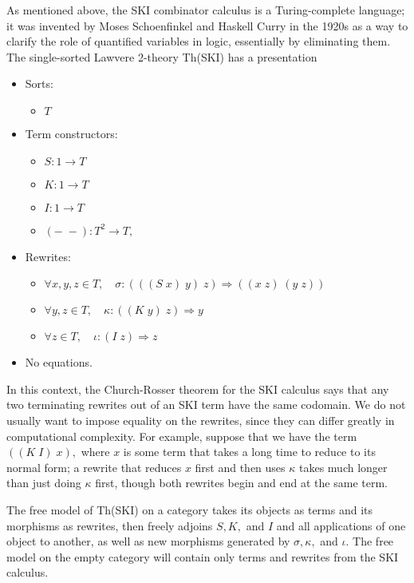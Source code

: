 \documentclass{article}
\newcommand{\maps}{\colon}
\begin{document}
As mentioned above, the SKI combinator calculus is a Turing-complete language; it was invented by Moses Schoenfinkel and Haskell Curry in the 1920s as a way to clarify the role of quantified variables in logic, essentially by eliminating them.  The single-sorted Lawvere 2-theory Th(SKI) has a presentation
\begin{center}
  \begin{itemize}
    \item Sorts:
    \begin{itemize}
      \item $T$
    \end{itemize}
    \item Term constructors:
    \begin{itemize}
      \item $S\maps 1 \to T$
      \item $K\maps 1 \to T$
      \item $I\maps 1 \to T$
      \item $(-\;-)\maps T^2 \to T,$
    \end{itemize}
    \item Rewrites:
    \begin{itemize}
      \item $\forall x,y,z \in T, \quad \sigma \maps (((S\; x)\; y)\; z) \Rightarrow ((x\; z)\; (y\; z))$
      \item $\forall y,z \in T, \quad \kappa \maps ((K\; y)\; z) \Rightarrow y$
      \item $\forall z \in T, \quad \iota \maps (I\; z) \Rightarrow z$
    \end{itemize}
    \item No equations.
  \end{itemize}
\end{center}
In this context, the Church-Rosser theorem for the SKI calculus says that any two terminating rewrites out of an SKI term have the same codomain.  We do not usually want to impose equality on the rewrites, since they can differ greatly in computational complexity.  For example, suppose that we have the term $((K\; I)\; x),$ where $x$ is some term that takes a long time to reduce to its normal form; a rewrite that reduces $x$ first and then uses $\kappa$ takes much longer than just doing $\kappa$ first, though both rewrites begin and end at the same term.

The free model of Th(SKI) on a category takes its objects as terms and its morphisms as rewrites, then freely adjoins $S,K,$ and $I$ and all applications of one object to another, as well as new morphisms generated by $\sigma,\kappa,$ and $\iota.$  The free model on the empty category will contain only terms and rewrites from the SKI calculus.
\end{document}

